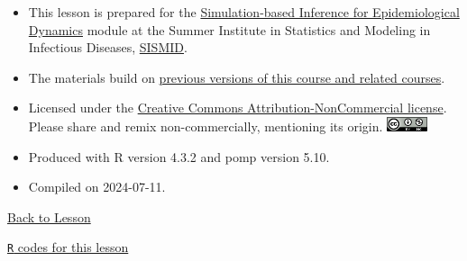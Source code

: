 \documentclass[
  letterpaper,
  DIV=11,
  numbers=noendperiod]{scrartcl}
\begin{document}
\begin{itemize}
\item
  This lesson is prepared for the
  \href{https://kingaa.github.io/sbied/}{Simulation-based Inference for
  Epidemiological Dynamics} module at the Summer Institute in Statistics
  and Modeling in Infectious Diseases,
  \href{https://www.biostat.washington.edu/suminst/sismid}{SISMID}.
\item
  The materials build on \href{../acknowledge.html}{previous versions of
  this course and related courses}.
\item
  Licensed under the
  \href{https://creativecommons.org/licenses/by-nc/4.0/}{Creative
  Commons Attribution-NonCommercial license}. Please share and remix
  non-commercially, mentioning its origin.
  \includegraphics[height=12pt]{../graphics/cc-by-nc}
\item
  Produced with R version 4.3.2 and pomp version 5.10.
\item
  Compiled on 2024-07-11.
\end{itemize}

\href{index.html}{Back to Lesson}

\href{./main.R}{\texttt{R} codes for this lesson}
\end{document}

